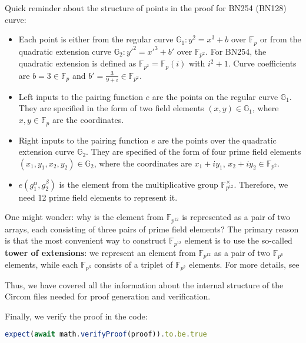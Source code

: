 \documentclass[../lecture-notes.tex]{subfiles}
\begin{document}
    Quick reminder about the structure of points in the proof for BN254 (BN128) curve:
    \begin{itemize}
        \item Each point is either from the regular curve $\mathbb{G}_1: y^2=x^3+b$ over $\mathbb{F}_p$ or from the quadratic extension curve $\mathbb{G}_2: y'^2=x'^3+b'$ over $\mathbb{F}_{p^2}$. For BN254, the quadratic extension is defined as $\mathbb{F}_{p^2} = \mathbb{F}_p(i)$ with $i^2+1$. Curve coefficients are $b=3 \in \mathbb{F}_p$ and $b'=\frac{3}{9+i} \in \mathbb{F}_{p^2}$.
        \item Left inputs to the pairing function $e$ are the points on the regular curve $\mathbb{G}_1$. They are specified in the form of two field elements $(x,y) \in \mathbb{G}_1$, where $x, y \in \mathbb{F}_p$ are the coordinates.
        \item Right inputs to the pairing function $e$ are the points over the quadratic extension curve $\mathbb{G}_2$. They are specified of the form of four prime field elements $(x_{1}, y_{1}, x_{2}, y_2) \in \mathbb{G}_2$, where the coordinates are $x_1+iy_1$, $x_2+iy_2 \in \mathbb{F}_{p^2}$.
        \item $e(g_1^{\alpha}, g_2^{\beta})$ is the element from the multiplicative group $\mathbb{F}_{p^{12}}^{\times}$. Therefore, we need 12 prime field elements to represent it.
    \end{itemize}

    \begin{remark}
        One might wonder: why is the element from $\mathbb{F}_{p^{12}}$ is represented as a pair of two arrays,
        each consisting of three pairs of prime field elements? The primary reason is that the most convenient
        way to construct $\mathbb{F}_{p^{12}}$ element is to use the so-called \textbf{tower of extensions}: we represent
        an element from $\mathbb{F}_{p^{12}}$ as a pair of two $\mathbb{F}_{p^6}$ elements, while each $\mathbb{F}_{p^6}$
        consists of a triplet of $\mathbb{F}_{p^2}$ elements. For more details, see 
    \end{remark}

    Thus, we have covered all the information about the internal structure of the Circom files needed for proof generation and verification.

    \vspace{0.5cm}

    Finally, we verify the proof in the code:
    \begin{lstlisting}[language=TypeScript,numbers=none,basicstyle=\footnotesize\ttfamily\normalsize]
expect(await math.verifyProof(proof)).to.be.true
    \end{lstlisting}
\end{document}
